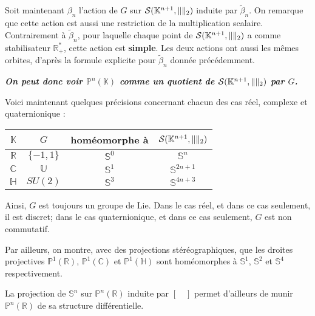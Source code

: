 \medskip
Soit maintenant $\beta_n$ l'action de $G$ sur $\mathcal{S}(\mathbb{K}^{n+1},\|\|_2)$ induite par $\tilde{\beta}_n$. %
On remarque que cette action est aussi une restriction de la multiplication scalaire.\\
Contrairement \`a $\tilde{\beta}_n$, pour laquelle chaque point de $\mathcal{S}(\mathbb{K}^{n+1},\|\|_2)$ a comme stabilisateur $\mathbb{R}_+^{\ast}$, %
cette action est \textbf{simple}. Les deux actions ont aussi les m\^emes orbites, d'apr\`es la formule explicite pour $\tilde{\beta}_n$ donn\'ee pr\'ec\'edemment.

\bigskip
\textit{\textbf{On peut donc voir $\mathbb{P}^n(\mathbb{K})$ comme un quotient de $\mathcal{S}(\mathbb{K}^{n+1},\|\|_2)$ par $G$.}}

\par
Voici maintenant quelques pr\'ecisions concernant chacun des cas r\'eel, complexe et quaternionique :

\renewcommand{\arraystretch}{1.6}
\begin{center}
\begin{tabular}{|c||c c|c|}
\hline
$\mathbb{K}$ & $G$ & hom\'eomorphe \`a & $\mathcal{S}(\mathbb{K}^{n+1},\|\|_2)$ \\
\hline
$\mathbb{R}$ & $\{-1,1\}$ & $\mathbb{S}^0$ & $\mathbb{S}^n$ \\
\hline
$\mathbb{C}$ & $\mathbb{U}$ & $\mathbb{S}^1$ & $\mathbb{S}^{2n+1}$ \\
\hline
$\mathbb{H}$ & $SU(2)$ & $\mathbb{S}^3$ & $\mathbb{S}^{4n+3}$ \\
\hline
\end{tabular}
\end{center}
\renewcommand{\arraystretch}{1}

Ainsi, $G$ est toujours un groupe de Lie. Dans le cas r\'eel, et dans ce cas seulement, il est discret; dans le cas quaternionique, et dans ce cas seulement, $G$ est non commutatif.
\par
Par ailleurs, on montre, avec des projections st\'er\'eographiques, que les droites projectives $\mathbb{P}^1(\mathbb{R})$, $\mathbb{P}^1(\mathbb{C})$ et $\mathbb{P}^1(\mathbb{H})$ %
sont hom\'eomorphes \`a $\mathbb{S}^1$, $\mathbb{S}^2$ et $\mathbb{S}^4$ respectivement.
\par
La projection de $\mathbb{S}^n$ sur $\mathbb{P}^n(\mathbb{R})$ induite par $[\quad]$ permet d'ailleurs de munir $\mathbb{P}^n(\mathbb{R})$ de sa structure diff\'erentielle.


